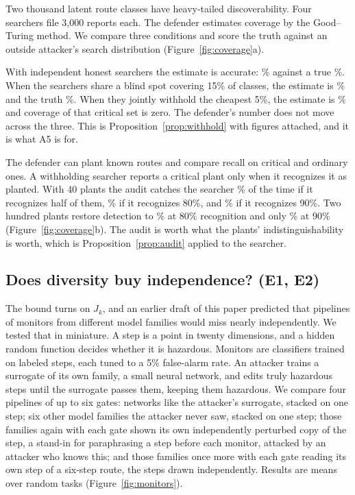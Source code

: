 \documentclass[10pt,twocolumn]{article}
\theoremstyle{plain}
\theoremstyle{definition}
\begin{document}
Two thousand latent route classes have heavy-tailed discoverability. Four searchers file
3,000 reports each. The defender estimates coverage by the Good--Turing method. We compare
three conditions and score the truth against an outside attacker's search distribution
(Figure~\ref{fig:coverage}a).

With independent honest searchers the estimate is accurate: \EstCovInd\% against a true
\TrueCovInd\%. When the searchers share a blind spot covering 15\% of classes, the estimate
is \EstCovBlind\% and the truth \TrueCovBlind\%. When they jointly withhold the cheapest 5\%,
the estimate is \EstCovWith\% and coverage of that critical set is zero. The defender's
number does not move across the three. This is Proposition~\ref{prop:withhold} with figures
attached, and it is what A5 is for.

The defender can plant known routes and compare recall on critical and ordinary ones. A
withholding searcher reports a critical plant only when it recognizes it as planted. With 40
plants the audit catches the searcher \PowerFortyHalf\% of the time if it recognizes half of
them, \PowerFortyEighty\% if it recognizes 80\%, and \PowerFortyNinety\% if it recognizes
90\%. Two hundred plants restore detection to \PowerTwoHundredEighty\% at 80\% recognition
and only \PowerTwoHundredNinety\% at 90\% (Figure~\ref{fig:coverage}b). The audit is worth
what the plants' indistinguishability is worth, which is Proposition~\ref{prop:audit}
applied to the searcher.

\subsection{Does diversity buy independence? (E1, E2)}\label{sec:expD}

The bound turns on $J_{k}$, and an earlier draft of this paper predicted that pipelines of
monitors from different model families would miss nearly independently. We tested that in
miniature. A step is a point in twenty dimensions, and a hidden random function decides
whether it is hazardous. Monitors are classifiers trained on labeled steps, each tuned to a
5\% false-alarm rate. An attacker trains a surrogate of its own family, a small neural
network, and edits truly hazardous steps until the surrogate passes them, keeping them
hazardous. We compare four pipelines of up to six gates: networks like the attacker's surrogate,
stacked on one step; six other model families the attacker never saw, stacked on one step;
those families again with each gate shown its own independently perturbed copy of the step, a
stand-in for paraphrasing a step before each monitor, attacked by an attacker who knows this;
and those families once more with each gate reading its own step of a six-step route, the
steps drawn independently. Results are means over
\MonReps{} random tasks (Figure~\ref{fig:monitors}).
\end{document}

